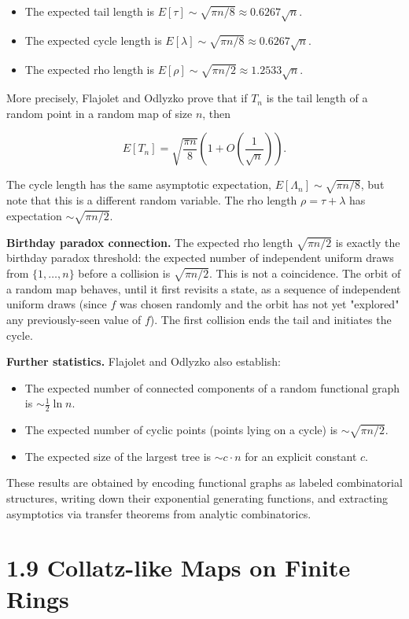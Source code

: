 \begin{itemize}
  \item The expected tail length is $E[\tau] \sim \sqrt{\pi n / 8} \approx 0.6267\sqrt{n}$.
  \item The expected cycle length is $E[\lambda] \sim \sqrt{\pi n / 8} \approx 0.6267\sqrt{n}$.
  \item The expected rho length is $E[\rho] \sim \sqrt{\pi n / 2} \approx 1.2533\sqrt{n}$.
\end{itemize}

More precisely, Flajolet and Odlyzko prove that if $T_n$ is the tail length of a random point in a random map of size $n$, then

\[
E[T_n] = \sqrt{\frac{\pi n}{8}}\left(1 + O\left(\frac{1}{\sqrt{n}}\right)\right).
\]

The cycle length has the same asymptotic expectation, $E[\Lambda_n] \sim \sqrt{\pi n / 8}$, but note that this is a different random variable. The rho length $\rho = \tau + \lambda$ has expectation $\sim \sqrt{\pi n/2}$.

\textbf{Birthday paradox connection.} The expected rho length $\sqrt{\pi n / 2}$ is exactly the birthday paradox threshold: the expected number of independent uniform draws from $\{ 1, \ldots, n\} $ before a collision is $\sqrt{\pi n / 2}$. This is not a coincidence. The orbit of a random map behaves, until it first revisits a state, as a sequence of independent uniform draws (since $f$ was chosen randomly and the orbit has not yet "explored" any previously-seen value of $f$). The first collision ends the tail and initiates the cycle.

\textbf{Further statistics.} Flajolet and Odlyzko also establish:
\begin{itemize}
  \item The expected number of connected components of a random functional graph is $\sim \frac{1}{2}\ln n$.
  \item The expected number of cyclic points (points lying on a cycle) is $\sim \sqrt{\pi n / 2}$.
  \item The expected size of the largest tree is $\sim c \cdot n$ for an explicit constant $c$.
\end{itemize}

These results are obtained by encoding functional graphs as labeled combinatorial structures, writing down their exponential generating functions, and extracting asymptotics via transfer theorems from analytic combinatorics.

\section{1.9 Collatz-like Maps on Finite Rings}

